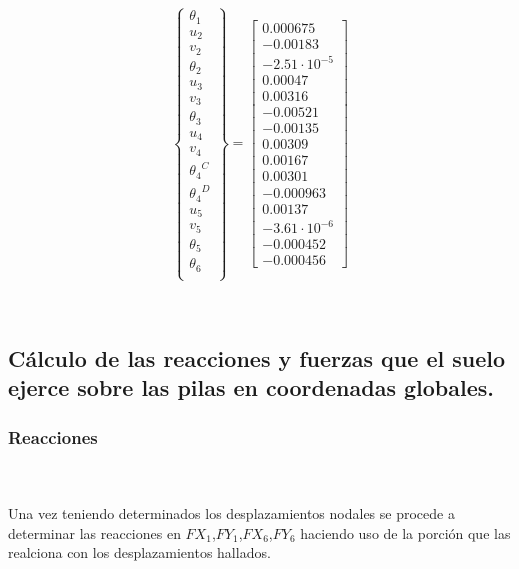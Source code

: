 \documentclass[a4paper]{article}
\begin{document}
{
\renewcommand{\arraystretch}{1.2}
\begin{center}

\begin{equation}\label{Desplazamientos Globales}
\left\{ \begin{array}{c}
{{\theta}_1} \\ {u_2} \\ {v_2} \\ {{\theta}_2} \\{u_3} \\
{v_3} \\ {{\theta}_3} \\ {u_4} \\ {v_4} \\{{\theta}_4}^C \\
{{\theta}_4}^D \\ {u_5} \\ {v_5} \\ {{\theta}_5} \\{{\theta}_6} \\
\end{array} \right\}=
 \begin{bmatrix}0.000675\\-0.00183\\-2.51 \cdot 10^{-5}\\0.00047\\0.00316\\-0.00521\\-0.00135\\0.00309\\0.00167\\0.00301\\-0.000963\\0.00137\\-3.61 \cdot 10^{-6}\\-0.000452\\-0.000456\end{bmatrix}
\end{equation}
\end{center}
}

\\



\subsection{Cálculo de las reacciones y fuerzas que el suelo ejerce sobre las pilas en coordenadas globales.}
\subsubsection{Reacciones}\\
\\
Una vez teniendo determinados los desplazamientos nodales se procede a determinar las reacciones en $FX_1$,$FY_1$,$FX_6$,$FY_6$ haciendo uso de la porción que las realciona con los desplazamientos hallados.
\end{document}
